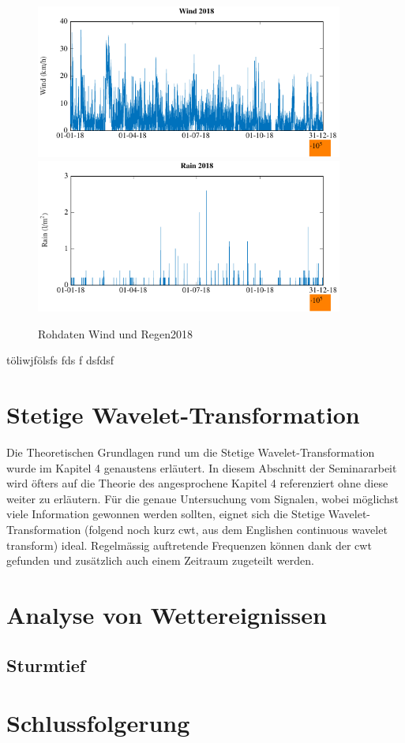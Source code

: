 \begin{refsection}
\begin{figure}[h]
	\centering
	\includegraphics[width=0.9\textwidth]{papers/wwt/images/raw_wind_wwt.pdf}
	\includegraphics[width=0.9\textwidth]{papers/wwt/images/raw_rain_wwt.pdf}
	\caption{Rohdaten Wind und Regen2018}
\end{figure}

\newpage
\newpage

töliwjfölsfs
fds
f
dsfdsf

\section{Stetige Wavelet-Transformation}

Die Theoretischen Grundlagen rund um die Stetige Wavelet-Transformation wurde im Kapitel 4 genaustens erläutert. 
In diesem Abschnitt der Seminararbeit wird öfters auf die Theorie des angesprochene Kapitel 4 referenziert ohne diese weiter zu erläutern. 
Für die genaue Untersuchung vom Signalen, wobei möglichst viele Information gewonnen werden sollten, eignet sich die Stetige Wavelet-Transformation (folgend noch kurz cwt, aus dem Englishen continuous wavelet transform)
ideal. 
Regelmässig auftretende Frequenzen können dank der cwt gefunden und zusätzlich auch einem Zeitraum zugeteilt werden.


\section{Analyse von Wettereignissen}

\subsection{Sturmtief}


\section{Schlussfolgerung}

\printbibliography[heading=subbibliography]
\end{refsection}
